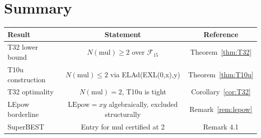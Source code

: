 \documentclass[11pt]{article}
\begin{document}
\section{Summary}

\begin{center}
\begin{tabular}{lcc}
\hline
Result & Statement & Reference \\
\hline
T32 lower bound & $N(\mathrm{mul})\geq 2$ over $\mathcal{F}_{15}$ & Theorem~\ref{thm:T32}\\
T10u construction & $N(\mathrm{mul})\leq 2$ via ELAd(EXL(0,x),y) & Theorem~\ref{thm:T10u}\\
T32 optimality & $N(\mathrm{mul})=2$, T10u is tight & Corollary~\ref{cor:T32}\\
LEpow borderline & $\mathrm{LEpow}=xy$ algebraically, excluded structurally & Remark~\ref{rem:lepow}\\
SuperBEST & Entry for mul certified at 2 & Remark 4.1 \\
\hline
\end{tabular}
\end{center}
\end{document}
